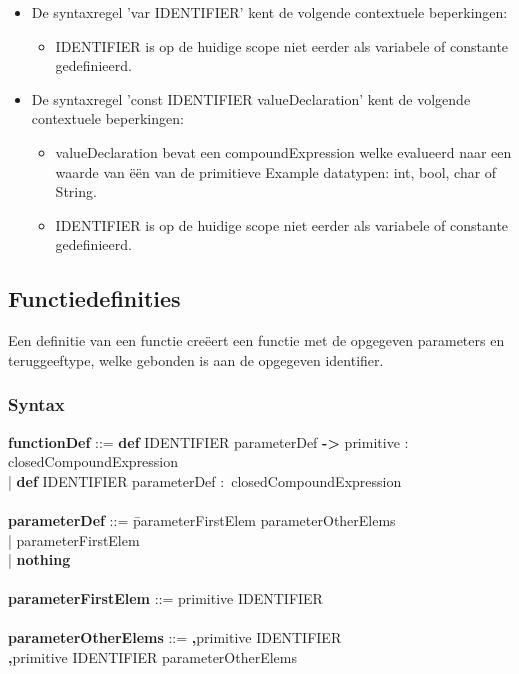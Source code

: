 \begin{itemize}
\begin{itemize}
            \end{itemize}  
        \item De syntaxregel 'var IDENTIFIER' kent de volgende contextuele beperkingen:
            \begin{itemize}
             \item IDENTIFIER is op de huidige scope niet eerder als variabele of constante gedefinieerd.
            \end{itemize}  
        \item De syntaxregel 'const IDENTIFIER valueDeclaration' kent de volgende contextuele beperkingen:
            \begin{itemize}
            \item valueDeclaration bevat een compoundExpression welke evalueerd naar een waarde van \"{e}\"{e}n van de primitieve Example datatypen: int, bool, char of String.
            \item IDENTIFIER is op de huidige scope niet eerder als variabele of constante gedefinieerd.
            \end{itemize}  
        \end{itemize}

\subsection{Functiedefinities}
Een definitie van een functie cre\"{e}ert een functie met de opgegeven parameters en teruggeeftype, welke gebonden is aan de opgegeven identifier.
    \subsubsection{Syntax}
        \begin{tabbing}
            {\bf functionDef}                 ::= \= \textbf{def} IDENTIFIER parameterDef \textbf{->} primitive \textbf{$\colon$} closedCompoundExpression\\
                                                  \>| \textbf{def} IDENTIFIER parameterDef \textbf{$\colon$} closedCompoundExpression\\
            \\
            {\bf parameterDef}                ::= \=parameterFirstElem parameterOtherElems\\
                                                  \>| parameterFirstElem\\
                                                  \>| \textbf{nothing}\\
            \\
            {\bf parameterFirstElem}          ::= primitive IDENTIFIER\\
            \\
            {\bf parameterOtherElems}         ::= \=\textbf{,}primitive IDENTIFIER\\
                                                  \>\textbf{,}primitive IDENTIFIER parameterOtherElems\\  
        \end{tabbing}
